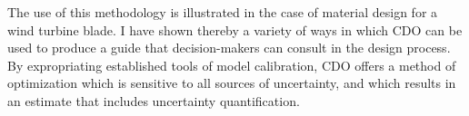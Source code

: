 \documentclass{article}
\begin{document}
The use of this methodology is illustrated in the case of material design for a wind turbine blade. I have shown thereby a variety of ways in which CDO can be used to produce a guide that decision-makers can consult in the design process. By expropriating established tools of model calibration, CDO offers a method of optimization which is sensitive to all sources of uncertainty, and which results in an estimate that includes uncertainty quantification.






\pagebreak


\end{document}
